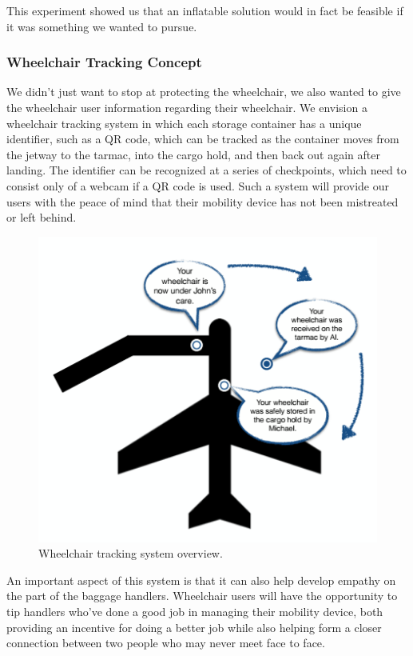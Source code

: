 This experiment showed us that an inflatable solution would in fact be feasible if it was something we wanted to pursue.

\subsubsection{Wheelchair Tracking Concept}

We didn't just want to stop at protecting the wheelchair, we also wanted to give the wheelchair user information regarding their wheelchair. 
We envision a wheelchair tracking system in which each storage container has a unique identifier, such as a QR code, which can be tracked as the container moves from the jetway to the tarmac, into the cargo hold, and then back out again after landing. The identifier can be recognized at a series of checkpoints, which need to consist only of a webcam if a QR code is used. Such a system will provide our users with the peace of mind that their mobility device has not been mistreated or left behind.

\begin{figure}[h!]
  \centering
     \includegraphics[width=12cm]{images/tracking.png}
   \caption{Wheelchair tracking system overview.}
  \label{fig:tracking}
\end{figure}


An important aspect of this system is that it can also help develop empathy on the part of the baggage handlers. Wheelchair users will have the opportunity to tip handlers who've done a good job in managing their mobility device, both providing an incentive for doing a better job while also helping form a closer connection between two people who may never meet face to face.


